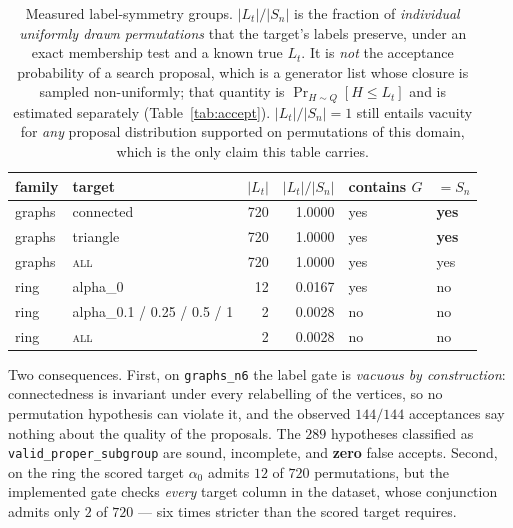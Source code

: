 \documentclass[11pt]{article}
\begin{document}
\begin{table}[t]
\centering
\caption{Measured label-symmetry groups. $|L_t|/|S_n|$ is the fraction of \emph{individual
uniformly drawn permutations} that the target's labels preserve, under an exact
membership test and a known true $L_t$. It is \emph{not} the acceptance probability of a
search proposal, which is a generator list whose closure is sampled non-uniformly; that
quantity is $\Pr_{H\sim Q}[H \le L_t]$ and is estimated separately (Table~\ref{tab:accept}).
$|L_t|/|S_n| = 1$ still entails vacuity for \emph{any} proposal distribution supported on
permutations of this domain, which is the only claim this table carries.}
\label{tab:semantics}
\small
\begin{tabular}{llrrll}
\toprule
family & target & $|L_t|$ & $|L_t|/|S_n|$ & contains $G$ & $=S_n$ \\
\midrule
graphs & connected & 720 & 1.0000 & yes & \textbf{yes} \\
graphs & triangle  & 720 & 1.0000 & yes & \textbf{yes} \\
graphs & \textsc{all} & 720 & 1.0000 & yes & yes \\
ring & alpha\_0 & 12 & 0.0167 & yes & no \\
ring & alpha\_0.1 / 0.25 / 0.5 / 1 & 2 & 0.0028 & no & no \\
ring & \textsc{all} & 2 & 0.0028 & no & no \\
\bottomrule
\end{tabular}
\end{table}

Two consequences. First, on \texttt{graphs\_n6} the label gate is \emph{vacuous by
construction}: connectedness is invariant under every relabelling of the vertices, so no
permutation hypothesis can violate it, and the observed $144/144$ acceptances say nothing
about the quality of the proposals. The $289$ hypotheses classified as
\texttt{valid\_proper\_subgroup} are sound, incomplete, and \textbf{zero} false accepts.
Second, on the ring the scored target $\alpha_0$ admits $12$ of $720$ permutations, but the
implemented gate checks \emph{every} target column in the dataset, whose conjunction admits
only $2$ of $720$ --- six times stricter than the scored target requires.
\end{document}

